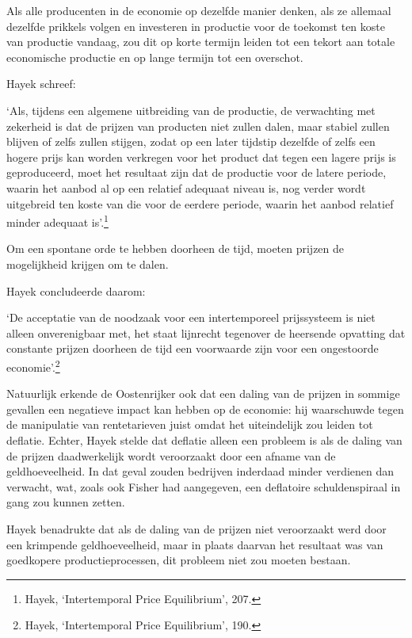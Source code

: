 \documentclass[smalldemyvopaper,11pt,twoside,onecolumn,openright,extrafontsizes,hidelinks]{memoir}
\begin{document}
Als alle producenten in de economie op dezelfde manier denken, als ze
allemaal dezelfde prikkels volgen en investeren in productie voor de
toekomst ten koste van productie vandaag, zou dit op korte termijn
leiden tot een tekort aan totale economische productie en op lange
termijn tot een overschot.

Hayek schreef:

`Als, tijdens een algemene uitbreiding van de productie, de verwachting
met zekerheid is dat de prijzen van producten niet zullen dalen, maar
stabiel zullen blijven of zelfs zullen stijgen, zodat op een later
tijdstip dezelfde of zelfs een hogere prijs kan worden verkregen voor
het product dat tegen een lagere prijs is geproduceerd, moet het
resultaat zijn dat de productie voor de latere periode, waarin het
aanbod al op een relatief adequaat niveau is, nog verder wordt
uitgebreid ten koste van die voor de eerdere periode, waarin het aanbod
relatief minder adequaat is'.\footnote{\hspace{0pt}Hayek, `Intertemporal
  Price Equilibrium', 207.}

Om een spontane orde te hebben doorheen de tijd, moeten prijzen de
mogelijkheid krijgen om te dalen.

Hayek concludeerde daarom:

`De acceptatie van de noodzaak voor een intertemporeel prijssysteem is
niet alleen onverenigbaar met, het staat lijnrecht tegenover de
heersende opvatting dat constante prijzen doorheen de tijd een
voorwaarde zijn voor een ongestoorde economie'.\footnote{\hspace{0pt}Hayek,
  `Intertemporal Price Equilibrium', 190.}

Natuurlijk erkende de Oostenrijker ook dat een daling van de prijzen in
sommige gevallen een negatieve impact kan hebben op de economie: hij
waarschuwde tegen de manipulatie van rentetarieven juist omdat het
uiteindelijk zou leiden tot deflatie. Echter, Hayek stelde dat deflatie
alleen een probleem is als de daling van de prijzen daadwerkelijk wordt
veroorzaakt door een afname van de geldhoeveelheid. In dat geval zouden
bedrijven inderdaad minder verdienen dan verwacht, wat, zoals ook Fisher
had aangegeven, een deflatoire schuldenspiraal in gang zou kunnen
zetten.

Hayek benadrukte dat als de daling van de prijzen niet veroorzaakt werd
door een krimpende geldhoeveelheid, maar in plaats daarvan het resultaat
was van goedkopere productieprocessen, dit probleem niet zou moeten
bestaan.
\end{document}
